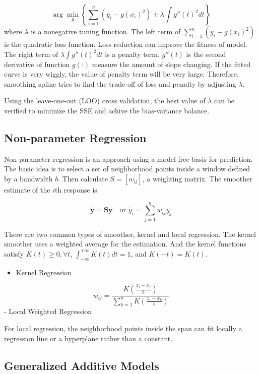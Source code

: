 \documentclass[
  11pt,
  openany]{memoir}
\providecommand{\tightlist}{%
  \setlength{\itemsep}{0pt}\setlength{\parskip}{0pt}}
\begin{document}
\[\arg\min_{g}\left\{\sum_{i=1}^n(y_i-g(x_i)^2)+\lambda\int g''(t)^2dt \right\}\]
where \(\lambda\) is a nonegative tuning function. The left term of \(\sum_{i=1}^n(y_i-g(x_i)^2)\) is the quadratic loss function. Loss reduction can improve the fitness of model.
The right term of \(\lambda\int g''(t)^2dt\) is a penalty term. \(g''(t)\) is the second derivative of function \(g(\cdot)\) measure the amount of slope changing. If the fitted curve is very wiggly, the value of penalty term will be very large.
Therefore, smoothing spline tries to find the trade-off of loss and penalty by adjusting \(\lambda\).

Using the leave-one-out (LOO) cross validation, the best value of \(\lambda\) can be verified to minimize the SSE and achive the bias-variance balance.

\hypertarget{non-parameter-regression}{%
\subsection{Non-parameter Regression}\label{non-parameter-regression}}

Non-parameter regression is an approach using a model-free basis for prediction. The basic idea is to select a set of neighborhood points inside a window defined by a bandwidth \(b\). Then calculate \(S=[w_{ij}]\), a weighting matrix. The smoother estimate of the \(i\)th response is

\[\mathbf{\tilde y}=\mathbf{Sy}\quad \text{or } \tilde y_i=\sum_{j=1}^n w_{ij}y_j\]

There are two common types of smoother, kernel and local regression.
The kernel smoother uses a weighted average for the estimation. And the kernel functions satisfy \(K(t)\ge 0,\forall t\), \(\int_{-\infty}^{+\infty}K(t)dt=1\), and \(K(-t)=K(t)\).

\begin{itemize}
\tightlist
\item
  Kernel Regression
\end{itemize}

\[w_{ij}=\frac{K(\frac{x_i-x_j}{b})}{\sum_{k=1}^n K(\frac{x_i-x_k}{b})}\]
- Local Weighted Regression

For local regression, the neighborhood points inside the span can fit locally a regression line or a hyperplane rather than a constant.

\hypertarget{generalized-additive-models}{%
\subsection{Generalized Additive Models}\label{generalized-additive-models}}
\end{document}
